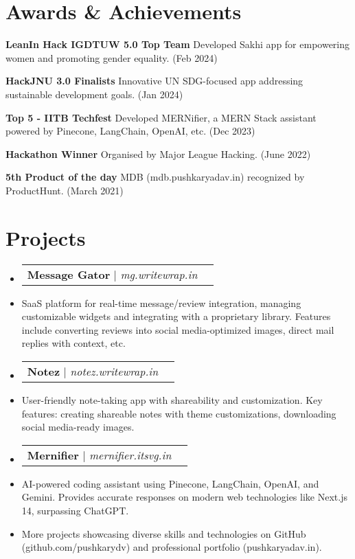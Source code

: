\documentclass[letterpaper,11pt]{article}
\makeatletter
\newcommand{\resumeItem}[1]{
  \item\small{
    {#1 \vspace{-2pt}}
  }
}
\newcommand{\resumeProjectHeading}[2]{
    \vspace{-2pt}\item
    \begin{tabular*}{0.97\textwidth}{l@{\extracolsep{\fill}}r}
      \small#1 & #2 \\
    \end{tabular*}\vspace{-7pt}
}
\newcommand{\resumeSubHeadingListStart}{\begin{itemize}[leftmargin=0.15in, label={}]}
\newcommand{\resumeSubHeadingListEnd}{\end{itemize}}
\makeatother
\begin{document}
\section{Awards \& Achievements}
  \vspace{2pt}
  \resumeSubHeadingListStart
  \small{
    \item{
    
    \textbf{LeanIn Hack IGDTUW 5.0 Top Team}{ Developed Sakhi app for empowering women and promoting gender equality. (Feb 2024)}

    \textbf{HackJNU 3.0 Finalists}{ Innovative UN SDG-focused app addressing sustainable development goals. (Jan 2024)}

    \textbf{Top 5 - IITB Techfest}{ Developed MERNifier, a MERN Stack assistant powered by Pinecone, LangChain, OpenAI, etc. (Dec 2023)}

    \textbf{Hackathon Winner}{ Organised by Major League Hacking. (June 2022)}

    \textbf{5th Product of the day}{ MDB (mdb.pushkaryadav.in) recognized by ProductHunt. (March 2021)}

    }}
  \resumeSubHeadingListEnd



\section{Projects}
\resumeSubHeadingListStart

\resumeProjectHeading{\textbf{Message Gator} | \emph{mg.writewrap.in}}{}
\resumeItem{SaaS platform for real-time message/review integration, managing customizable widgets and integrating with a proprietary library. Features include converting reviews into social media-optimized images, direct mail replies with context, etc.}

\resumeProjectHeading{\textbf{Notez} | \emph{notez.writewrap.in}}{}
\resumeItem{User-friendly note-taking app with shareability and customization. Key features: creating shareable notes with theme customizations, downloading social media-ready images.}

\resumeProjectHeading{\textbf{Mernifier} | \emph{mernifier.itsvg.in}}{}
\resumeItem{AI-powered coding assistant using Pinecone, LangChain, OpenAI, and Gemini. Provides accurate responses on modern web technologies like Next.js 14, surpassing ChatGPT.}

\resumeItem{More projects showcasing diverse skills and technologies on GitHub (github.com/pushkarydv) and professional portfolio (pushkaryadav.in).}


\resumeSubHeadingListEnd

\end{document}

